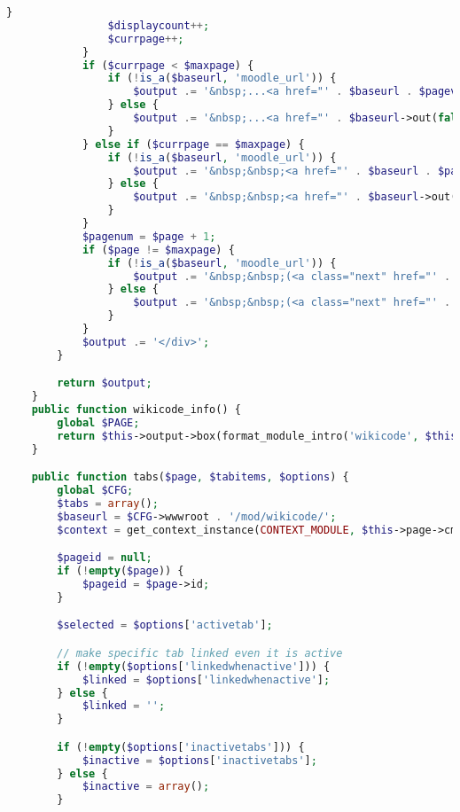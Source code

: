 \begin{lstlisting}[language=PHP]
                }
                $displaycount++;
                $currpage++;
            }
            if ($currpage < $maxpage) {
                if (!is_a($baseurl, 'moodle_url')) {
                    $output .= '&nbsp;...<a href="' . $baseurl . $pagevar . '=' . $maxpage . '">' . $maxpage . '</a>&nbsp;';
                } else {
                    $output .= '&nbsp;...<a href="' . $baseurl->out(false, array($pagevar => $maxpage)) . '">' . $maxpage . '</a>&nbsp;';
                }
            } else if ($currpage == $maxpage) {
                if (!is_a($baseurl, 'moodle_url')) {
                    $output .= '&nbsp;&nbsp;<a href="' . $baseurl . $pagevar . '=' . $currpage . '">' . $currpage . '</a>';
                } else {
                    $output .= '&nbsp;&nbsp;<a href="' . $baseurl->out(false, array($pagevar => $currpage)) . '">' . $currpage . '</a>';
                }
            }
            $pagenum = $page + 1;
            if ($page != $maxpage) {
                if (!is_a($baseurl, 'moodle_url')) {
                    $output .= '&nbsp;&nbsp;(<a class="next" href="' . $baseurl . $pagevar . '=' . $pagenum . '">' . get_string('next') . '</a>)';
                } else {
                    $output .= '&nbsp;&nbsp;(<a class="next" href="' . $baseurl->out(false, array($pagevar => $pagenum)) . '">' . get_string('next') . '</a>)';
                }
            }
            $output .= '</div>';
        }

        return $output;
    }
    public function wikicode_info() {
        global $PAGE;
        return $this->output->box(format_module_intro('wikicode', $this->page->activityrecord, $PAGE->cm->id), 'generalbox', 'intro');
    }

    public function tabs($page, $tabitems, $options) {
        global $CFG;
        $tabs = array();
        $baseurl = $CFG->wwwroot . '/mod/wikicode/';
        $context = get_context_instance(CONTEXT_MODULE, $this->page->cm->id);

        $pageid = null;
        if (!empty($page)) {
            $pageid = $page->id;
        }

        $selected = $options['activetab'];

        // make specific tab linked even it is active
        if (!empty($options['linkedwhenactive'])) {
            $linked = $options['linkedwhenactive'];
        } else {
            $linked = '';
        }

        if (!empty($options['inactivetabs'])) {
            $inactive = $options['inactivetabs'];
        } else {
            $inactive = array();
        }


\end{lstlisting}
